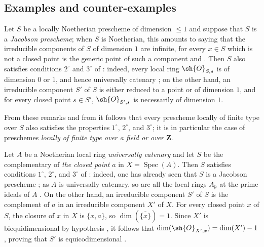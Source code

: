 \subsection{Examples and counter-examples}
\label{subsection:IV.10.7}

\begin{env}[10.7.1]
\label{IV.10.7.1}
Let $S$ be a locally Noetherian prescheme of dimension $\leq 1$ and suppose that $S$ is a \emph{Jacobson prescheme}; when $S$ is Noetherian, this amounts to saying that the irreducible components of $S$ of dimension $1$ are infinite, for every $x\in S$ which is not a closed point is the generic point of such a component  and .
Then $S$ also satisfies conditions $2^\circ$ and $3^\circ$ of : indeed, every local ring $\sh{O}_{S,s}$ is of dimension $0$ or $1$, and hence universally catenary ; on the other hand, an irreducible component $S'$ of $S$ is either reduced
to a point or of dimension $1$, and for every closed point $s\in S'$, $\sh{O}_{S',s}$ is necessarily of dimension $1$.

From these remarks and from  it follows that every prescheme locally of finite type over $S$ also satisfies the properties $1^\circ$, $2^\circ$, and $3^\circ$; it is in particular the case of preschemes \emph{locally of finite type over a field or over $\mathbf{Z}$}.
\end{env}

\begin{env}[10.7.2]
\label{IV.10.7.2}
Let $A$ be a Noetherian local ring \emph{universally catenary} and let $S$ be the complementary of \emph{the closed point} $a$ in $X=\operatorname{Spec}(A)$.
Then $S$ satisfies conditions $1^\circ$, $2^\circ$, and $3^\circ$ of : indeed, one has already seen that $S$ is a Jacobson prescheme ; as $A$ is universally catenary, so are all the local rings $A_\mathfrak{p}$ at the prime ideals of $A$ .
On the other hand, an irreducible component $S'$ of $S$ is the complement of $a$ in an irreducible component $X'$ of $X$. For every closed point $x$ of $S$, the closure of $x$ in $X$ is $\{x,a\}$, so $\dim(\overline{\{x\}})=1$. Since $X'$ is biequidimensional by hypothesis , it follows that $\dim(\sh{O}_{X',x})=\dim(X')-1$ , proving that $S'$ is equicodimensional .
\end{env}


